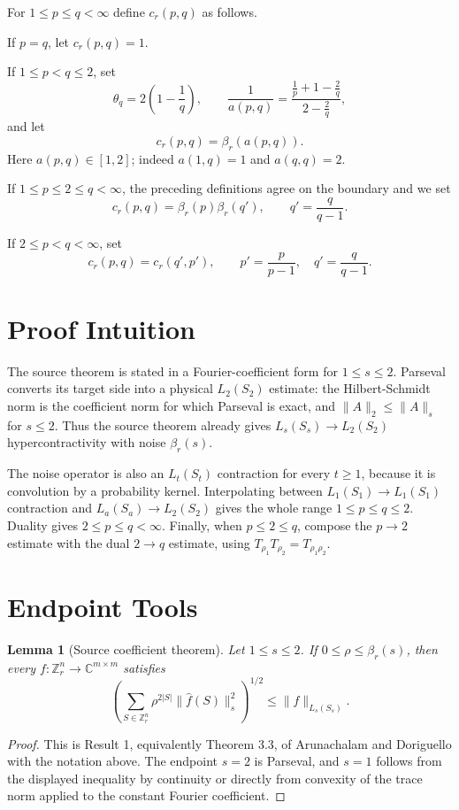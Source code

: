 \documentclass[11pt]{article}
\newtheorem{lemma}{Lemma}
\newcommand{\C}{\mathbb C}
\newcommand{\Z}{\mathbb Z}
\begin{document}
For $1\leq p\leq q<\infty$ define $c_r(p,q)$ as follows.

If $p=q$, let $c_r(p,q)=1$.

If $1\leq p<q\leq2$, set
\[
  \theta_q=2\left(1-\frac1q\right), \qquad
  \frac1{a(p,q)}
  =
  \frac{\frac1p+1-\frac2q}{2-\frac2q},
\]
and let
\[
  c_r(p,q)=\beta_r(a(p,q)).
\]
Here $a(p,q)\in[1,2]$; indeed $a(1,q)=1$ and $a(q,q)=2$.

If $1\leq p\leq2\leq q<\infty$, the preceding definitions agree on the
boundary and we set
\[
  c_r(p,q)=\beta_r(p)\beta_r(q'),
  \qquad q'=\frac{q}{q-1}.
\]

If $2\leq p<q<\infty$, set
\[
  c_r(p,q)=c_r(q',p'), \qquad
  p'=\frac{p}{p-1},\quad q'=\frac{q}{q-1}.
\]

\section*{Proof Intuition}

The source theorem is stated in a Fourier-coefficient form for
$1\leq s\leq2$. Parseval converts its target side into a physical
$L_2(S_2)$ estimate: the Hilbert-Schmidt norm is the coefficient norm for
which Parseval is exact, and $\|A\|_2\leq\|A\|_s$ for $s\leq2$.
Thus the source theorem already gives $L_s(S_s)\to L_2(S_2)$
hypercontractivity with noise $\beta_r(s)$.

The noise operator is also an $L_t(S_t)$ contraction for every $t\geq1$,
because it is convolution by a probability kernel. Interpolating between
$L_1(S_1)\to L_1(S_1)$ contraction and $L_a(S_a)\to L_2(S_2)$ gives the whole
range $1\leq p\leq q\leq2$. Duality gives $2\leq p\leq q<\infty$. Finally,
when $p\leq2\leq q$, compose the $p\to2$ estimate with the dual $2\to q$
estimate, using $T_{\rho_1}T_{\rho_2}=T_{\rho_1\rho_2}$.

\section*{Endpoint Tools}

\begin{lemma}[Source coefficient theorem]
\label{lem:source}
Let $1\leq s\leq2$. If $0\leq\rho\leq\beta_r(s)$, then every
$f:\Z_r^n\to\C^{m\times m}$ satisfies
\[
  \left(\sum_{S\in\Z_r^n}
  \rho^{2|S|}\|\widehat f(S)\|_s^2\right)^{1/2}
  \leq
  \|f\|_{L_s(S_s)}.
\]
\end{lemma}

\begin{proof}
This is Result 1, equivalently Theorem 3.3, of Arunachalam and Doriguello
with the notation above. The endpoint $s=2$ is Parseval, and $s=1$ follows
from the displayed inequality by continuity or directly from convexity of the
trace norm applied to the constant Fourier coefficient.
\end{proof}
\end{document}
